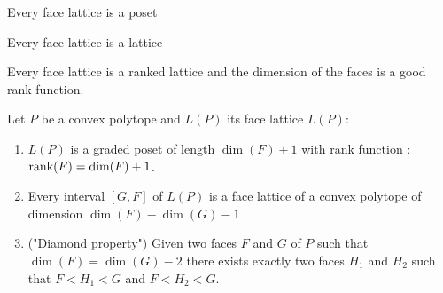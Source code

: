 \begin{proposition}
  Every face lattice is a poset
\end{proposition}

\begin{proposition}
  Every face lattice is a lattice
\end{proposition}

\begin{proposition}
  Every face lattice is a ranked lattice and the dimension of the faces is a good rank function.
\end{proposition}

\begin{proposition}

\end{proposition}

\begin{proposition}
  Let $P$ be a convex polytope and $L(P)$ its face lattice $L(P)$:

  \begin{enumerate}
    \item $L(P)$ is a graded poset of length $\dim(F) + 1$ with rank function : $\operatorname{rank}(F) = \dim(F) + 1$.
    \item Every interval $[G,F]$ of $L(P)$ is a face lattice of a convex polytope of dimension $\dim(F) - \dim(G) - 1$
    \item ("Diamond property") Given two faces $F$ and $G$ of $P$ such that $\dim(F) = \dim(G) - 2$ there exists exactly two faces $H_1$ and $H_2$ such that $F < H_1 < G$ and $F < H_2 < G$.
  \end{enumerate}
\end{proposition}

